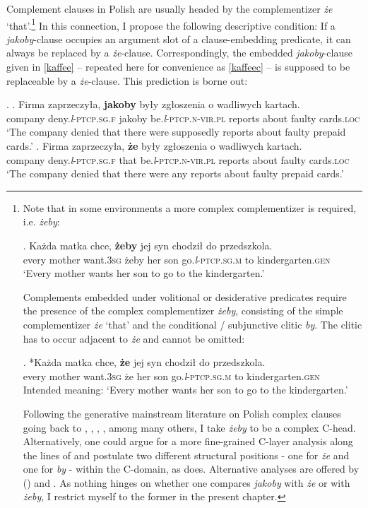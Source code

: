 \documentclass[output=paper
,modfonts
,nonflat]{langsci/langscibook}
\newcommand{\glossformat}[1]{\textsc{#1}}
\newcommand{\thirdperson}{\glossformat{3}\xspace}
\newcommand{\fem}{\glossformat{f}\xspace}
\newcommand{\gen}{\glossformat{gen}\xspace}
\newcommand{\loc}{\glossformat{loc}\xspace}
\newcommand{\lptcp}{\emph{l}\glossformat{-ptcp}\xspace}
\newcommand{\masc}{\glossformat{m}\xspace}
\newcommand{\nvir}{\glossformat{n-vir}\xspace}
\newcommand{\pl}{\glossformat{pl}\xspace}
\newcommand{\sg}{\glossformat{sg}\xspace}
\begin{document}
Complement clauses in Polish are usually headed by the complementizer \emph{że} `that'.\footnote{Note that in some environments a more complex complementizer is required, i.e. \emph{żeby}:

\exg.		Każda matka chce, \textbf{żeby} jej syn chodził do przedszkola. \\
		every mother want.{\thirdperson}{\sg} żeby her son go.{\lptcp}.{\sg}.{\masc} to kindergarten.{\gen} \\
		`Every mother wants her son to go to the kindergarten.'

Complements embedded under volitional or desiderative predicates require the presence of the complex complementizer \emph{żeby}, consisting of the simple complementizer \emph{że} `that' and the conditional / subjunctive clitic \emph{by}. The clitic has to occur adjacent to \emph{że} and cannot be omitted:

\exg.		*Każda matka chce, \textbf{że} jej syn chodził do przedszkola. \\
		every mother want.{\thirdperson}{\sg} że her son go.{\lptcp}.{\sg}.{\masc} to kindergarten.{\gen} \\
		Intended meaning: `Every mother wants her son to go to the kindergarten.'

Following the generative mainstream literature on Polish complex clauses going back to \textcite{Tajsner1989}, \textcite{Willim1989}, \textcite{Witkos1998}, \textcite{Bondaruk2004}, among many others, I take \emph{żeby} to be a complex C-head. Alternatively, one could argue for a more fine-grained C-layer analysis along the lines of \textcite{Rizzi1997} and postulate two different structural positions - one for \emph{że} and one for \emph{by} - within the C-domain, as \textcite{Szczegielniak1999} does. Alternative analyses are offered by \citeauthor{Migdalski2016} (\citeyear{Migdalski2006, Migdalski2009, Migdalski2016}) and \textcite{Tomaszewicz2012}. As nothing hinges on whether one compares \emph{jakoby} with \emph{że} or with \emph{żeby}, I restrict myself to the former in the present chapter.    
}
In this connection, I propose the following descriptive condition: If a \emph{jakoby}-clause occupies an argument slot of a clause-embedding predicate, it can always be replaced by a \emph{że}-clause. Correspondingly, the embedded \emph{jakoby}-clause  given in \ref{kaffee} – repeated here for convenience as \ref{kaffeec} – is supposed to be replaceable by a \emph{że}-clause. This prediction is borne out: 

\ex.	\ag.		Firma zaprzeczyła, \textbf{jakoby} były zgłoszenia o wadliwych kartach. \label{kaffeec} \\
			company deny.{\lptcp}.{\sg}.{\fem} jakoby be.{\lptcp}.{\nvir}.{\pl} reports about faulty cards.{\loc} \\
			`The company denied that there were supposedly reports about faulty prepaid cards.'  
	\bg.		Firma zaprzeczyła, \textbf{że} były zgłoszenia o wadliwych kartach. \\
			company deny.{\lptcp}.{\sg}.{\fem} that be.{\lptcp}.{\nvir}.{\pl} reports about faulty cards.{\loc} \\
			`The company denied that there were any reports about faulty prepaid cards.'
\end{document}
